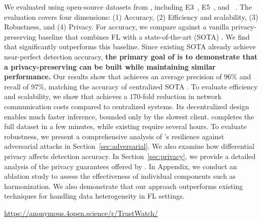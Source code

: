 
\smallskip
{}
\smallskip

\noindent
We evaluated \Sys using open-source datasets from \darpa, including E3~\cite{error3}, E5~\cite{bug5}, and \optc~\cite{anjum2021analyzing}. The evaluation covers four dimensions: (1) Accuracy, (2) Efficiency and scalability, (3) Robustness, and (4) Privacy. For accuracy, we compare \Sys against a vanilla privacy-preserving \pids baseline that combines FL with a state-of-the-art (SOTA) \pids. We find that \Sys significantly outperforms this baseline. Since existing SOTA \pids already achieve near-perfect detection accuracy, {\bf the primary goal of \Sys is to demonstrate that a privacy-preserving \pids can be built while maintaining similar performance.} Our results show that \Sys achieves an average precision of 96\% and recall of 97\%, matching the accuracy of centralized SOTA \pids. To evaluate efficiency and scalability, we show that \Sys achieves a 170-fold reduction in network communication costs compared to centralized systems. Its decentralized design enables much faster inference, bounded only by the slowest client. \Sys completes the full \optc dataset in a few minutes, while existing \pids require several hours. To evaluate robustness, we present a comprehensive analysis of \Sys’s resilience against adversarial attacks in Section~\ref{sec:adversarial}. We also examine how differential privacy affects detection accuracy. In Section~\ref{sec:privacy}, we provide a detailed analysis of the privacy guarantees offered by \Sys. In Appendix, we conduct an ablation study to assess the effectiveness of individual components such as \wordvec harmonization. We also demonstrate that our approach outperforms existing techniques for handling data heterogeneity in FL settings.

 \url{https://anonymous.4open.science/r/TrustWatch/}


